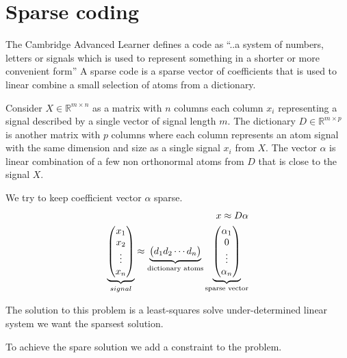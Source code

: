 \chapter{Sparse coding}
\thispagestyle{empty}

The Cambridge Advanced Learner defines a code as ``..a system of numbers, letters or signals which is used to represent something in a shorter or more convenient form''
A sparse code is a sparse vector of coefficients that is used to linear combine a small selection of atoms from a dictionary.


Consider $X \in \mathbb{R}^{m\times n}$  as a matrix with $n$ columns each column $x_{i}$ representing a signal described by a single vector of signal length $m$.
The dictionary $D\in\mathbb{R}^{m \times p}$ is another matrix with $p$ columns where each column represents an atom signal with the same dimension and size as a single signal $x_{i}$ from $X$.
The vector $\alpha$ is linear combination of a few non orthonormal atoms from $D$ that is close to the signal $X$.

We try to keep coefficient vector $\alpha$ sparse. 
\begin{align}
x \approx D\alpha\notag\\
\underbrace{\begin{pmatrix} x_1 \\ x_2 \\ \vdots \\ x_n \end{pmatrix}}_{signal} \approx \underbrace{\begin{pmatrix} d_1  d_2 \cdots d_n \end{pmatrix}}_{\textrm{dictionary atoms}}
\underbrace{\begin{pmatrix} \alpha_1 \\ 0 \\ \vdots \\ \alpha_n \end{pmatrix}}_{\textrm{sparse vector}}
\end{align}

The solution to this problem is a least-squares solve under-determined linear system we want the sparsest solution.

To achieve the spare solution we add a constraint to the problem. 

